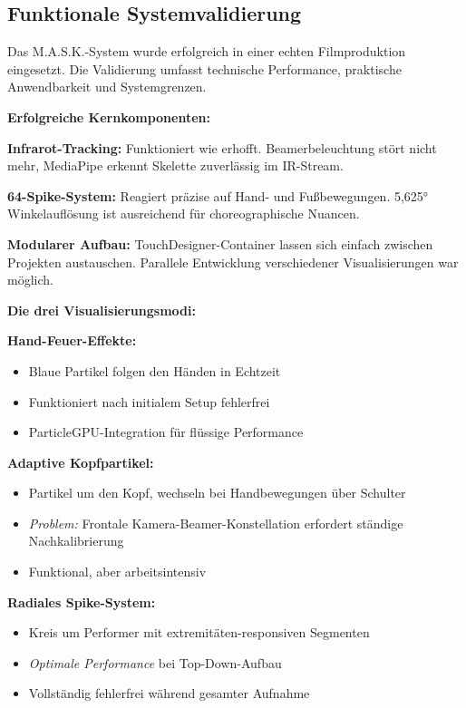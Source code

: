 \subsection{Funktionale Systemvalidierung}

Das M.A.S.K.-System wurde erfolgreich in einer echten Filmproduktion eingesetzt. Die Validierung umfasst technische Performance, praktische Anwendbarkeit und Systemgrenzen.

\textbf{Erfolgreiche Kernkomponenten:}

\textbf{Infrarot-Tracking:} Funktioniert wie erhofft. Beamerbeleuchtung stört nicht mehr, MediaPipe erkennt Skelette zuverlässig im IR-Stream.

\textbf{64-Spike-System:} Reagiert präzise auf Hand- und Fußbewegungen. 5,625° Winkelauflösung ist ausreichend für choreographische Nuancen.

\textbf{Modularer Aufbau:} TouchDesigner-Container lassen sich einfach zwischen Projekten austauschen. Parallele Entwicklung verschiedener Visualisierungen war möglich.

\textbf{Die drei Visualisierungsmodi:}

\textbf{Hand-Feuer-Effekte:}
\begin{itemize}
    \item Blaue Partikel folgen den Händen in Echtzeit
    \item Funktioniert nach initialem Setup fehlerfrei
    \item ParticleGPU-Integration für flüssige Performance
\end{itemize}

\textbf{Adaptive Kopfpartikel:}
\begin{itemize}
    \item Partikel um den Kopf, wechseln bei Handbewegungen über Schulter
    \item \textit{Problem:} Frontale Kamera-Beamer-Konstellation erfordert ständige Nachkalibrierung
    \item Funktional, aber arbeitsintensiv
\end{itemize}

\textbf{Radiales Spike-System:}
\begin{itemize}
    \item Kreis um Performer mit extremitäten-responsiven Segmenten
    \item \textit{Optimale Performance} bei Top-Down-Aufbau
    \item Vollständig fehlerfrei während gesamter Aufnahme
\end{itemize}

